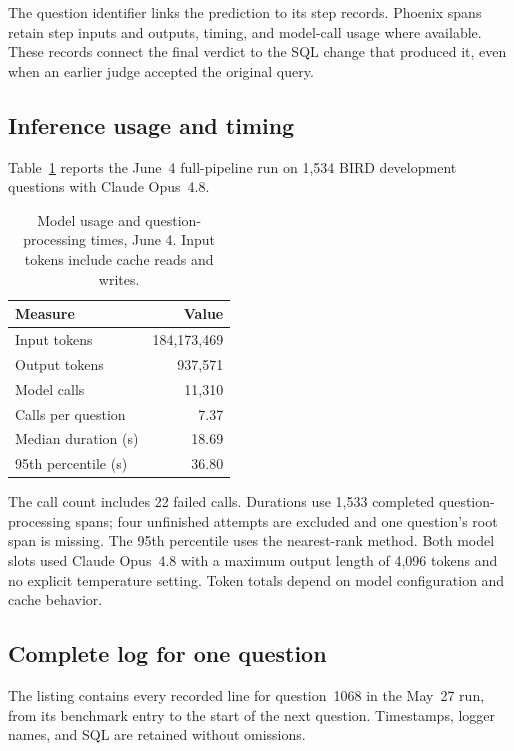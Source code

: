 The question identifier links the prediction to its step records. Phoenix
spans retain step inputs and outputs, timing, and model-call usage where
available. These records connect the final verdict to the SQL change that
produced it, even when an earlier judge accepted the original query.

\subsection{Inference usage and timing}
\label{app:usage}
Table~\ref{tab:archive-cost} reports the June~4 full-pipeline run on
1,534 BIRD development questions with Claude Opus~4.8.

\begin{table}[ht]
\caption{Model usage and question-processing times, June 4. Input tokens
include cache reads and writes.}
\label{tab:archive-cost}
\centering\footnotesize
\begin{tabular}{@{}lr@{}}
\toprule
Measure & Value \\
\midrule
Input tokens & 184,173,469 \\
Output tokens & 937,571 \\
Model calls & 11,310 \\
Calls per question & 7.37 \\
Median duration (s) & 18.69 \\
95th percentile (s) & 36.80 \\
\bottomrule
\end{tabular}
\end{table}

The call count includes 22 failed calls. Durations use 1,533 completed
question-processing spans; four unfinished attempts are excluded and one
question's root span is missing. The 95th percentile uses the nearest-rank
method. Both model slots used Claude Opus~4.8 with a maximum output length
of 4,096 tokens and no explicit temperature setting. Token totals depend
on model configuration and cache behavior.

\subsection{Complete log for one question}
The listing contains every recorded line for question~1068 in the May~27
run, from its benchmark entry to the start of the next question.
Timestamps, logger names, and SQL are retained without omissions.


